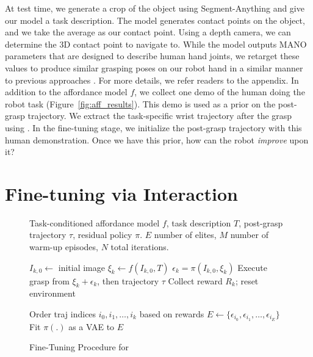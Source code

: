 At test time, we generate a crop of the object using Segment-Anything \cite{kirillov2023segment} and give our model a task description. The model generates contact points on the object, and we take the average as our contact point. Using a depth camera, we can determine the 3D contact point to navigate to. While the model outputs MANO parameters \cite{MANO:SIGGRAPHASIA:2017} that are designed to describe human hand joints, we retarget these values to produce similar grasping poses on our robot hand in a similar manner to previous approaches \cite{handa2020dexpilot, sivakumar2022robotic}. For more details, we refer readers to the appendix. In addition to the affordance model $f$, we collect one demo of the human doing the robot task (Figure~\ref{fig:aff_results}). This demo is used as a prior on the post-grasp trajectory.  We extract the task-specific wrist trajectory after the grasp using \cite{FrankMocap_2021_ICCV}. In the fine-tuning stage, we initialize the post-grasp trajectory with this human demonstration. Once we have this prior, how can the robot \textit{improve} upon it? 


\section{Fine-tuning via Interaction}

\begin{figure}
\vspace{-0.3in}
\begin{minipage}{\linewidth}
\begin{algorithm}[H]
\caption{\small Fine-Tuning Procedure for \ours}\label{alg:cap}
\begin{algorithmic}
\small
\REQUIRE Task-conditioned affordance model $f$, task description $T$, post-grasp trajectory $\tau$, residual policy $\pi$. $E$ number of elites, $M$ number of warm-up episodes, $N$ total iterations. 

    \STATE $I_{k, 0} \gets $ initial image
    \STATE $\xi_k \gets f(I_{k, 0}, T)$
    \STATE $\epsilon_k = \pi(I_{k, 0}, \xi_k)$
    \STATE Execute grasp from $\xi_k + \epsilon_k$, then trajectory $\tau$
    \STATE Collect reward $R_k$; reset environment

        \STATE Order traj indices $i_0, i_1, \dots, i_k$ based on rewards
        \STATE $E \gets \{ \epsilon_{i_0}, \epsilon_{i_1}, \dots, \epsilon_{i_E} \} $
        \STATE Fit $\pi(.)$ as a VAE to $E$
    \ENDIF
\ENDFOR

\end{algorithmic}
\label{algo:finetune}

\end{algorithm}
\end{minipage}
\end{figure}



